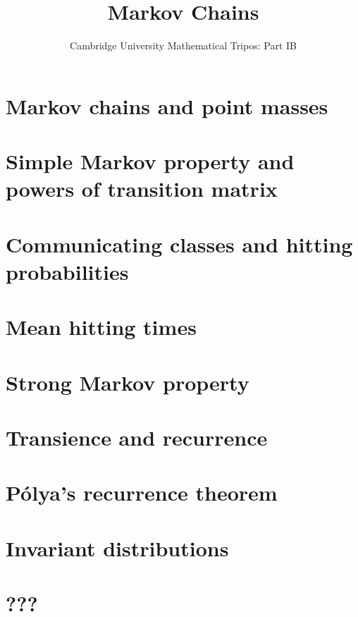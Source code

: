 \documentclass{article}
\title{Markov Chains}
\author{Cambridge University Mathematical Tripos: Part IB}
\begin{document}
\maketitle

\tableofcontentsnewpage{}

\section{Markov chains and point masses}

\section{Simple Markov property and powers of transition matrix}

\section{Communicating classes and hitting probabilities}

\section{Mean hitting times}

\section{Strong Markov property}

\section{Transience and recurrence}

\section{P\'olya's recurrence theorem}

\section{Invariant distributions}

\section{???}

\end{document}
